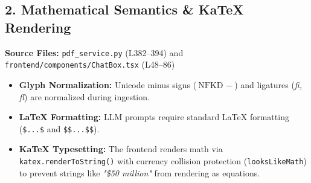 \documentclass[10pt,a4paper]{article}
\begin{document}
\subsection{2. Mathematical Semantics \& KaTeX Rendering}
\textbf{Source Files:} \texttt{pdf\_service.py} (L382--394) and \texttt{frontend/components/ChatBox.tsx} (L48--86)

\begin{itemize}[leftmargin=1.5em, itemsep=2pt]
    \item \textbf{Glyph Normalization:} Unicode minus signs ($\text{NFKD } -$) and ligatures (\textit{fi, fl}) are normalized during ingestion.
    \item \textbf{LaTeX Formatting:} LLM prompts require standard LaTeX formatting (\texttt{\$...\$} and \texttt{\$\$...\$\$}).
    \item \textbf{KaTeX Typesetting:} The frontend renders math via \texttt{katex.renderToString()} with currency collision protection (\texttt{looksLikeMath}) to prevent strings like \textit{"\$50 million"} from rendering as equations.
\end{itemize}
\end{document}
